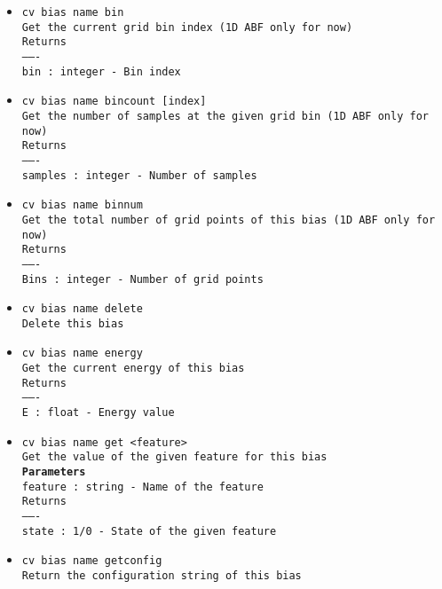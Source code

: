 \begin{itemize}
\item \texttt{cv bias name bin}
\\
\texttt{Get the current grid bin index (1D ABF only for now)}
\\
\texttt{Returns}
\\
\texttt{-------}
\\
\texttt{bin : integer - Bin index}
\item \texttt{cv bias name bincount [index]}
\\
\texttt{Get the number of samples at the given grid bin (1D ABF only for now)}
\\
\texttt{Returns}
\\
\texttt{-------}
\\
\texttt{samples : integer - Number of samples}
\item \texttt{cv bias name binnum}
\\
\texttt{Get the total number of grid points of this bias (1D ABF only for now)}
\\
\texttt{Returns}
\\
\texttt{-------}
\\
\texttt{Bins : integer - Number of grid points}
\item \texttt{cv bias name delete}
\\
\texttt{Delete this bias}
\item \texttt{cv bias name energy}
\\
\texttt{Get the current energy of this bias}
\\
\texttt{Returns}
\\
\texttt{-------}
\\
\texttt{E : float - Energy value}
\item \texttt{cv bias name get <feature>}
\\
\texttt{Get the value of the given feature for this bias}
\\
\texttt{\textbf{Parameters}}
\\
\texttt{feature : string - Name of the feature}
\\
\texttt{Returns}
\\
\texttt{-------}
\\
\texttt{state : 1/0 - State of the given feature}
\item \texttt{cv bias name getconfig}
\\
\texttt{Return the configuration string of this bias}
\\

\end{itemize}
